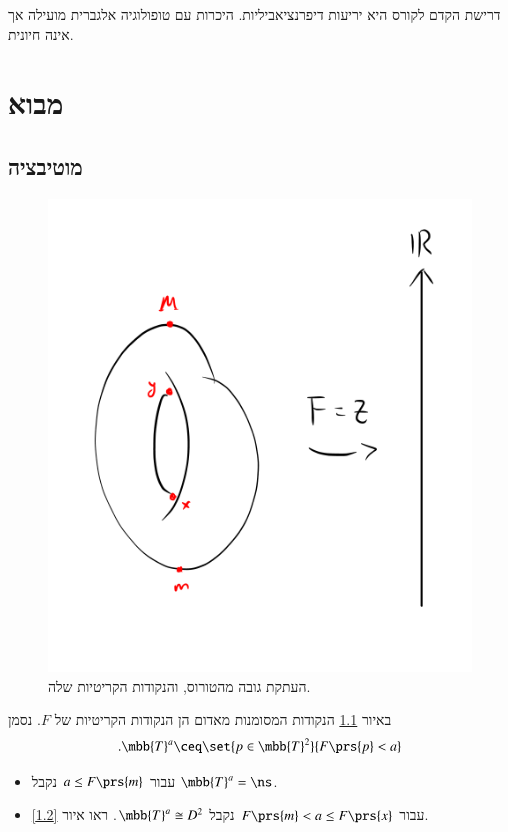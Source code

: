 \documentclass[a4paper,10pt,twoside,openany]{book}
\begin{document}
דרישת הקדם לקורס היא יריעות דיפרנציאביליות. היכרות עם טופולוגיה אלגברית מועילה אך אינה חיונית.

\mainmatter

\chapter{מבוא}
\section{מוטיבציה}

\begin{example}

\begin{figure}
\centering
\includegraphics[scale=0.5]{sources/1.1}
\caption{העתקת גובה מהטורוס, והנקודות הקריטיות שלה.}
\label{1.1}
\end{figure}

באיור
\ref{1.1}
הנקודות המסומנות מאדום הן הנקודות הקריטיות של
$F$.
נסמן
\[\text{.} \mbb{T}^a \ceq \set{p \in \mbb{T}^2}{F\prs{p} < a}\]
\begin{itemize}
\item עבור
$a \leq F\prs{m}$
נקבל
$\mbb{T}^a = \ns$.
\item עבור
$F\prs{m} < a \leq F\prs{x}$
נקבל
$\mbb{T}^a \cong D^2$.
ראו איור
\ref{1.2}.


\end{itemize}
\end{example}
\end{document}
